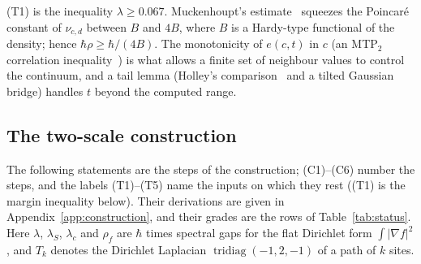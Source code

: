 \documentclass[11pt,a4paper]{article}
\theoremstyle{definition}
\theoremstyle{remark}
\newcommand{\hr}{\hbar\rho}
\begin{document}
(T1) is the inequality $\lambda\ge0.067$. Muckenhoupt's estimate~\cite{Mu,BR} squeezes the Poincaré constant of $\nu_{c,d}$ between $B$ and $4B$, where $B$ is a Hardy-type functional of the density; hence $\hr\ge\hbar/(4B)$. The monotonicity of $e(c,t)$ in $c$ (an MTP$_2$ correlation inequality~\cite{KR}) is what allows a finite set of neighbour values to control the continuum, and a tail lemma (Holley's comparison~\cite{Ho} and a tilted Gaussian bridge) handles $t$ beyond the computed range.

\subsection{The two-scale construction}\label{sec:construction}

The following statements are the steps of the construction; (C1)--(C6) number the steps, and the labels (T1)--(T5) name the inputs on which they rest ((T1) is the margin inequality below). Their derivations are given in Appendix~\ref{app:construction}, and their grades are the rows of Table~\ref{tab:status}. Here $\lambda$, $\lambda_S$, $\lambda_c$ and $\rho_f$ are $\hbar$ times spectral gaps for the flat Dirichlet form $\int|\nabla f|^2$, and $T_k$ denotes the Dirichlet Laplacian $\operatorname{tridiag}(-1,2,-1)$ of a path of $k$ sites.
\end{document}

